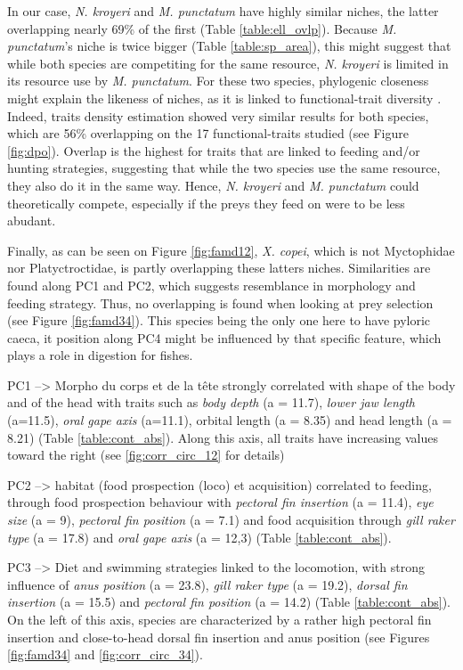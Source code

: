 In our case, \textit{N. kroyeri} and \textit{M. punctatum} have highly similar niches, the latter overlapping nearly 69\% of the first (Table \ref{table:ell_ovlp}). Because \textit{M. punctatum}'s niche is twice bigger (Table \ref{table:sp_area}), this might suggest that while both species are competiting for the same resource, \textit{N. kroyeri} is limited in its resource use by \textit{M. punctatum}. For these two species, phylogenic closeness might explain the likeness of niches, as it is linked to functional-trait diversity \citep{tucker2018}. Indeed, traits density estimation showed very similar results for both species, which are 56\% overlapping on the 17 functional-traits studied (see Figure \ref{fig:dpo}). Overlap is the highest for traits that are linked to feeding and/or hunting strategies, suggesting that while the two species use the same resource, they also do it in the same way. Hence, \textit{N. kroyeri} and \textit{M. punctatum} could theoretically compete, especially if the preys they feed on were to be less abudant.

Finally, as can be seen on Figure \ref{fig:famd12}, \textit{X. copei}, which is not Myctophidae nor Platyctroctidae, is partly overlapping these latters niches. Similarities are found along PC1 and PC2, which suggests resemblance in morphology and feeding strategy. Thus, no overlapping is found when looking at prey selection (see Figure \ref{fig:famd34}). This species being the only one here to have pyloric caeca, it position along PC4 might be influenced by that specific feature, which plays a role in digestion for fishes. 




PC1 --> Morpho du corps et de la tête
 strongly correlated with shape of the body and of the head with traits such as \emph{body depth} (a = 11.7), \emph{lower jaw length} (a=11.5), \emph{oral gape axis} (a=11.1), orbital length (a = 8.35) and head length (a = 8.21) (Table \ref{table:cont_abs}). Along this axis, all traits have increasing values toward the right (see \ref{fig:corr_circ_12} for details)

PC2 --> habitat (food prospection (loco) et acquisition)
correlated to feeding, through food prospection behaviour with \emph{pectoral fin insertion} (a = 11.4), \emph{eye size} (a = 9), \emph{pectoral fin position} (a = 7.1) and food acquisition through \emph{gill raker type} (a = 17.8) and \emph{oral gape axis} (a = 12,3) (Table \ref{table:cont_abs}).

PC3 --> Diet and swimming strategies
linked to the locomotion, with strong influence of \emph{anus position} (a = 23.8), \emph{gill raker type} (a = 19.2), \emph{dorsal fin insertion} (a = 15.5) and \emph{pectoral fin position} (a = 14.2) (Table \ref{table:cont_abs}). On the left of this axis, species are characterized by a rather high pectoral fin insertion and close-to-head dorsal fin insertion and anus position (see Figures \ref{fig:famd34} and \ref{fig:corr_circ_34}).

